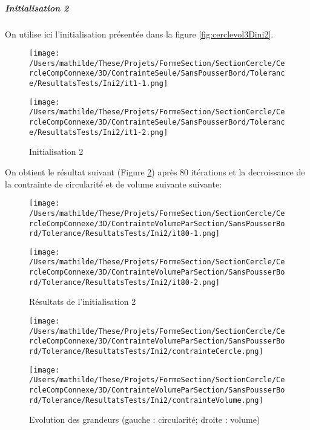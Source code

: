 \documentclass[11pt,a4paper]{article}
\begin{document}
\subparagraph{Initialisation 2} On utilise ici l'initialisation présentée dans la figure \ref{fig:cerclevol3Dini2}.

\begin{figure}[H]
	\label{fig:cerclesvol3Dini2}
	\begin{minipage}{0.45\textwidth}
		\centering
		\texttt{[image: /Users/mathilde/These/Projets/FormeSection/SectionCercle/CercleCompConnexe/3D/ContrainteSeule/SansPousserBord/Tolerance/ResultatsTests/Ini2/it1-1.png]}
	\end{minipage}
	\begin{minipage}{0.45\textwidth}
		\centering
		\texttt{[image: /Users/mathilde/These/Projets/FormeSection/SectionCercle/CercleCompConnexe/3D/ContrainteSeule/SansPousserBord/Tolerance/ResultatsTests/Ini2/it1-2.png]}
	\end{minipage}
	\caption{Initialisation 2}	
\end{figure}

On obtient le résultat suivant (Figure \ref{fig:cerclevol3Dini2Fin}) après 80 itérations et la decroissance de la contrainte de circularité et de volume suivante suivante:

\begin{figure}[H]
	\label{fig:cerclevol3Dini2Fin}
	\begin{minipage}{0.45\textwidth}
		\centering
		\texttt{[image: /Users/mathilde/These/Projets/FormeSection/SectionCercle/CercleCompConnexe/3D/ContrainteVolumeParSection/SansPousserBord/Tolerance/ResultatsTests/Ini2/it80-1.png]}
	\end{minipage}
	\begin{minipage}{0.45\textwidth}
		\texttt{[image: /Users/mathilde/These/Projets/FormeSection/SectionCercle/CercleCompConnexe/3D/ContrainteVolumeParSection/SansPousserBord/Tolerance/ResultatsTests/Ini2/it80-2.png]}	
	\end{minipage}
	\caption{Résultats de l'initialisation 2}	
\end{figure}

\begin{figure}[H]
	\label{fig:cerclevol3DobjFin}
	\begin{minipage}{0.45\textwidth}
		\centering
		\texttt{[image: /Users/mathilde/These/Projets/FormeSection/SectionCercle/CercleCompConnexe/3D/ContrainteVolumeParSection/SansPousserBord/Tolerance/ResultatsTests/Ini2/contrainteCercle.png]}
	\end{minipage}	
	\begin{minipage}{0.45\textwidth}
		\centering
		\texttt{[image: /Users/mathilde/These/Projets/FormeSection/SectionCercle/CercleCompConnexe/3D/ContrainteVolumeParSection/SansPousserBord/Tolerance/ResultatsTests/Ini2/contrainteVolume.png]}
	\end{minipage}	
\caption{Evolution des grandeurs (gauche : circularité; droite : volume)}	
\end{figure}
\end{document}
